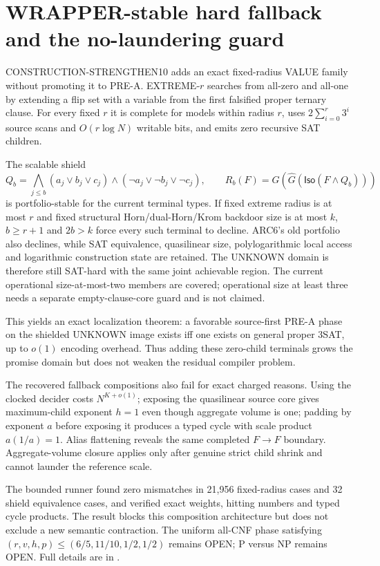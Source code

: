 \section{WRAPPER-stable hard fallback and the no-laundering guard}

CONSTRUCTION-STRENGTHEN10 adds an exact fixed-radius VALUE family without
promoting it to PRE-A.  \textsc{EXTREME-$r$} searches from all-zero and
all-one by extending a flip set with a variable from the first falsified
proper ternary clause.  For every fixed $r$ it is complete for models within
radius $r$, uses $2\sum_{i=0}^r3^i$ source scans and $O(r\log N)$ writable
bits, and emits zero recursive SAT children.

The scalable shield
\[
 Q_b=\bigwedge_{j\le b}(a_j\vee b_j\vee c_j)\wedge
 (\neg a_j\vee\neg b_j\vee\neg c_j),
 \qquad R_b(F)=G(\widehat G(\mathsf{Iso}(F\wedge Q_b)))
\]
is portfolio-stable for the current terminal types.  If fixed extreme radius
is at most $r$ and fixed structural Horn/dual-Horn/Krom backdoor size is at
most $k$, $b\ge r+1$ and $2b>k$ force every such terminal to decline.
ARC6's old portfolio also declines, while SAT equivalence, quasilinear size,
polylogarithmic local access and logarithmic construction state are retained.
The UNKNOWN domain is therefore still SAT-hard with the same joint
achievable region.  The current operational size-at-most-two members are
covered; operational size at least three needs a separate empty-clause-core
guard and is not claimed.

This yields an exact localization theorem: a favorable source-first PRE-A
phase on the shielded UNKNOWN image exists iff one exists on general proper
3SAT, up to $o(1)$ encoding overhead.  Thus adding these zero-child terminals
grows the promise domain but does not weaken the residual compiler problem.

The recovered fallback compositions also fail for exact charged reasons.
Using the clocked decider costs $N^{K+o(1)}$; exposing the quasilinear source
core gives maximum-child exponent $h=1$ even though aggregate volume is one;
padding by exponent $a$ before exposing it produces a typed cycle with scale
product $a(1/a)=1$.  Alias flattening reveals the same completed $F\to F$
boundary.  Aggregate-volume closure applies only after genuine strict child
shrink and cannot launder the reference scale.

The bounded runner found zero mismatches in 21,956 fixed-radius cases and 32
shield equivalence cases, and verified exact weights, hitting numbers and
typed cycle products.  The result blocks this composition architecture but
does not exclude a new semantic contraction.  The uniform all-CNF phase
satisfying $(r,v,h,p)\le(6/5,11/10,1/2,1/2)$ remains OPEN; P versus NP remains
OPEN.  Full details are in
.
